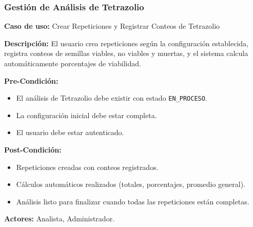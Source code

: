 \subsubsection{Gestión de Análisis de Tetrazolio}

\noindent\textbf{Caso de uso:} Crear Repeticiones y Registrar Conteos de Tetrazolio

\vspace{0.5em}
\noindent\textbf{Descripción:} El usuario crea repeticiones según la configuración establecida, registra conteos de semillas viables, no viables y muertas, y el sistema calcula automáticamente porcentajes de viabilidad.

\vspace{0.5em}
\noindent\textbf{Pre-Condición:}
\begin{itemize}[nosep]
    \item El análisis de Tetrazolio debe existir con estado \texttt{EN\_PROCESO}.
    \item La configuración inicial debe estar completa.
    \item El usuario debe estar autenticado.
\end{itemize}

\vspace{0.5em}
\noindent\textbf{Post-Condición:}
\begin{itemize}[nosep]
    \item Repeticiones creadas con conteos registrados.
    \item Cálculos automáticos realizados (totales, porcentajes, promedio general).
    \item Análisis listo para finalizar cuando todas las repeticiones están completas.
\end{itemize}

\vspace{0.5em}
\noindent\textbf{Actores:} Analista, Administrador.

